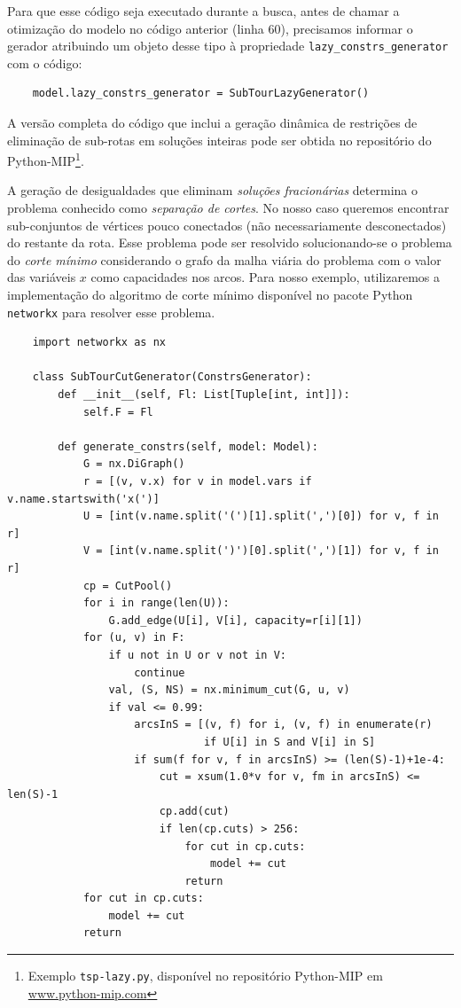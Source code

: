 \documentclass[a4paper,11pt,fleqn]{article}
\begin{document}
Para que esse código seja executado durante a busca, antes de chamar a otimização do modelo no código anterior (linha 60), precisamos informar o gerador atribuindo um objeto desse tipo à propriedade \texttt{lazy\_constrs\_generator} com o código: 

\begin{verbatim}
    model.lazy_constrs_generator = SubTourLazyGenerator()
\end{verbatim}

A versão completa do código que inclui a geração dinâmica de restrições de eliminação de sub-rotas em soluções inteiras pode ser obtida no repositório do Python-MIP\footnote{Exemplo \texttt{tsp-lazy.py}, disponível no repositório Python-MIP em \url{www.python-mip.com}}.

A geração de desigualdades que eliminam \emph{soluções fracionárias} determina o problema conhecido como \emph{separação de cortes}. No nosso caso queremos encontrar sub-conjuntos de vértices pouco conectados (não necessariamente desconectados) do restante da rota. Esse problema pode ser resolvido solucionando-se o problema do \emph{corte mínimo} considerando o grafo da malha viária do problema com o valor das variáveis $x$ como capacidades nos arcos. 
Para nosso exemplo, utilizaremos a implementação do algoritmo de corte mínimo disponível no pacote Python \texttt{networkx} para resolver esse problema.

\begin{verbatim}
    import networkx as nx

    class SubTourCutGenerator(ConstrsGenerator):
        def __init__(self, Fl: List[Tuple[int, int]]):
            self.F = Fl

        def generate_constrs(self, model: Model):
            G = nx.DiGraph()
            r = [(v, v.x) for v in model.vars if v.name.startswith('x(')]
            U = [int(v.name.split('(')[1].split(',')[0]) for v, f in r]
            V = [int(v.name.split(')')[0].split(',')[1]) for v, f in r]
            cp = CutPool()
            for i in range(len(U)):
                G.add_edge(U[i], V[i], capacity=r[i][1])
            for (u, v) in F:
                if u not in U or v not in V:
                    continue
                val, (S, NS) = nx.minimum_cut(G, u, v)
                if val <= 0.99:
                    arcsInS = [(v, f) for i, (v, f) in enumerate(r)
                               if U[i] in S and V[i] in S]
                    if sum(f for v, f in arcsInS) >= (len(S)-1)+1e-4:
                        cut = xsum(1.0*v for v, fm in arcsInS) <= len(S)-1
                        cp.add(cut)
                        if len(cp.cuts) > 256:
                            for cut in cp.cuts:
                                model += cut
                            return
            for cut in cp.cuts:
                model += cut
            return
\end{verbatim}
\end{document}
